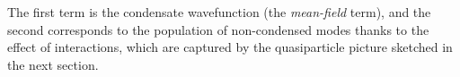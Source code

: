 	

	
	The first term is the condensate wavefunction (the \emph{mean-field} term), and the second corresponds to the population of non-condensed modes thanks to the effect of interactions, which are captured by the quasiparticle picture sketched in the next section.	

